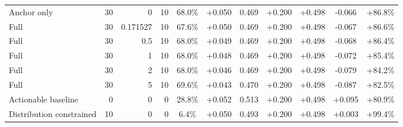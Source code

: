 \begin{table}[htbp]
\begin{tabular}{lrrrccccccc}
Anchor only & 30 & 0 & 10 & 68.0\% & +0.050 & 0.469 & +0.200 & +0.498 & -0.066 & +86.8\% \\
Full & 30 & 0.171527 & 10 & 67.6\% & +0.050 & 0.469 & +0.200 & +0.498 & -0.067 & +86.6\% \\
Full & 30 & 0.5 & 10 & 68.0\% & +0.049 & 0.469 & +0.200 & +0.498 & -0.068 & +86.4\% \\
Full & 30 & 1 & 10 & 68.0\% & +0.048 & 0.469 & +0.200 & +0.498 & -0.072 & +85.4\% \\
Full & 30 & 2 & 10 & 68.0\% & +0.046 & 0.469 & +0.200 & +0.498 & -0.079 & +84.2\% \\
Full & 30 & 5 & 10 & 69.6\% & +0.043 & 0.470 & +0.200 & +0.498 & -0.087 & +82.5\% \\
Actionable baseline & 0 & 0 & 0 & 28.8\% & +0.052 & 0.513 & +0.200 & +0.498 & +0.095 & +80.9\% \\
Distribution constrained & 10 & 0 & 0 & 6.4\% & +0.050 & 0.493 & +0.200 & +0.498 & +0.003 & +99.4\% \\
\bottomrule
\end{tabular}
\end{table}